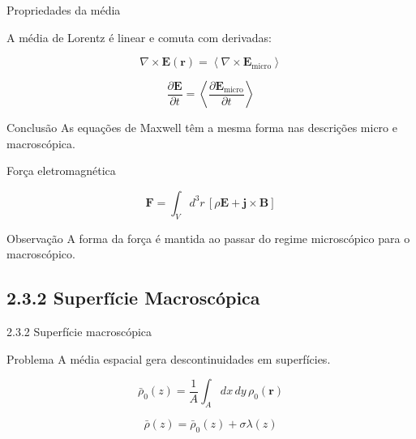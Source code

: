 \documentclass[aspectratio=169]{beamer}
\begin{document}
\begin{frame}{Propriedades da média}
\small

A média de Lorentz é linear e comuta com derivadas:

\begin{equation}
\nabla \times \mathbf{E}(\mathbf{r})
=
\left\langle \nabla \times \mathbf{E}_{\text{micro}} \right\rangle
\tag{2.38}
\end{equation}

\begin{equation}
\frac{\partial \mathbf{E}}{\partial t}
=
\left\langle
\frac{\partial \mathbf{E}_{\text{micro}}}{\partial t}
\right\rangle
\tag{2.39}
\end{equation}

\vspace{0.1cm}

\begin{block}{Conclusão}
As equações de Maxwell têm a mesma forma nas descrições micro e macroscópica.
\end{block}

\end{frame}

\begin{frame}{Força eletromagnética}
\small

\begin{equation}
\mathbf{F}
=
\int_V d^3r\,
\left[\rho \mathbf{E} + \mathbf{j}\times \mathbf{B}\right]
\tag{2.40}
\end{equation}

\begin{block}{Observação}
A forma da força é mantida ao passar do regime microscópico para o macroscópico.
\end{block}

\end{frame}

\subsection{2.3.2 Superfície Macroscópica}

\begin{frame}{2.3.2 Superfície macroscópica}
\small

\begin{block}{Problema}
A média espacial gera descontinuidades em superfícies.
\end{block}

\vspace{0.1cm}

\begin{equation}
\bar{\rho}_0(z)
=
\frac{1}{A}\int_A dx\,dy\,\rho_0(\mathbf{r})
\tag{2.41}
\end{equation}

\begin{equation}
\bar{\rho}(z)
=
\bar{\rho}_0(z) + \sigma \lambda(z)
\tag{2.42}
\end{equation}

\end{frame}
\end{document}
